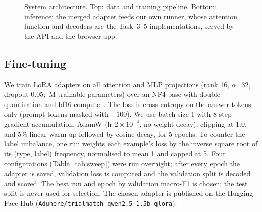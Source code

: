\documentclass[conference]{IEEEtran}
\newcommand{\code}[1]{\texttt{\small #1}}
\begin{document}
\begin{figure}[t]
\centering
{}
\caption{System architecture. Top: data and training pipeline. Bottom: inference; the merged adapter feeds our own runner, whose attention function and decoders are the Task~3--5 implementations, served by the API and the browser app.}
\label{fig:arch}
\end{figure}

\subsection{Fine-tuning}
We train LoRA adapters on all attention and MLP projections (rank 16, $\alpha$=32, dropout 0.05; \TrainableParams{}\,M trainable parameters) over an NF4 base with double quantisation and bf16 compute~\cite{dettmers2023qlora}. The loss is cross-entropy on the answer tokens only (prompt tokens masked with $-100$). We use batch size 1 with 8-step gradient accumulation, AdamW (lr $2\times10^{-4}$, no weight decay), clipping at 1.0, and 5\% linear warm-up followed by cosine decay, for 5 epochs. To counter the label imbalance, one run weights each example's loss by the inverse square root of its (type, label) frequency, normalised to mean 1 and capped at 5. Four configurations (Table~\ref{tab:sweep}) were run overnight; after every epoch the adapter is saved, validation loss is computed and the validation split is decoded and scored. The best run and epoch by validation macro-F1 is chosen; the test split is never used for selection. The chosen adapter is published on the Hugging Face Hub (\code{Aduhere/trialmatch-qwen2.5-1.5b-qlora}).
\end{document}
